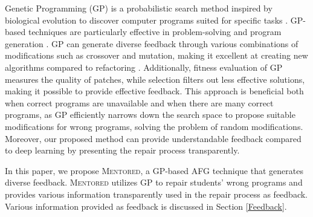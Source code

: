 \documentclass[10pt,conference]{IEEEtran}
\begin{document}
    Genetic Programming (GP) is a probabilistic search method inspired by biological evolution to discover computer programs suited for specific tasks \cite{forrest1993genetic,koza1992programming}. GP-based techniques are particularly effective in problem-solving and program generation \cite{le2011genprog,yuan2018arja,eiben2003genetic,cao2023code,harada2024towards}. GP can generate diverse feedback through various combinations of modifications such as crossover and mutation, making it excellent at creating new algorithms compared to refactoring \cite{silva2023automatic}. Additionally, fitness evaluation of GP measures the quality of patches, while selection filters out less effective solutions, making it possible to provide effective feedback. This approach is beneficial both when correct programs are unavailable and when there are many correct programs, as GP efficiently narrows down the search space to propose suitable modifications for wrong programs, solving the problem of random modifications. Moreover, our proposed method can provide understandable feedback compared to deep learning by presenting the repair process transparently.

    In this paper, we propose \textsc{Mentored}, a GP-based AFG technique that generates diverse feedback. \textsc{Mentored} utilizes GP to repair students' wrong programs and provides various information transparently used in the repair process as feedback. Various information provided as feedback is discussed in Section \ref{Feedback}.
\end{document}
